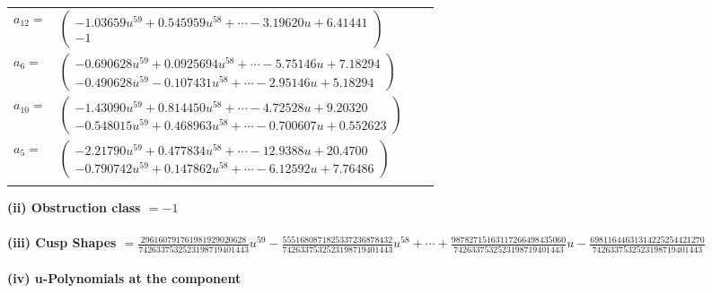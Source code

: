 \documentclass[1p]{elsarticle_modified}
\theoremstyle{definition}
\begin{document}
\begin{tabular}{m{7pt} m{180pt} m{7pt} m{180pt} }
\flushright $a_{12}=$&$\begin{pmatrix}-1.03659 u^{59}+0.545959 u^{58}+\cdots-3.19620 u+6.41441\\-1\end{pmatrix}$ \\
\flushright $a_{6}=$&$\begin{pmatrix}-0.690628 u^{59}+0.0925694 u^{58}+\cdots-5.75146 u+7.18294\\-0.490628 u^{59}-0.107431 u^{58}+\cdots-2.95146 u+5.18294\end{pmatrix}$ \\
\flushright $a_{10}=$&$\begin{pmatrix}-1.43090 u^{59}+0.814450 u^{58}+\cdots-4.72528 u+9.20320\\-0.548015 u^{59}+0.468963 u^{58}+\cdots-0.700607 u+0.552623\end{pmatrix}$ \\
\flushright $a_{5}=$&$\begin{pmatrix}-2.21790 u^{59}+0.477834 u^{58}+\cdots-12.9388 u+20.4700\\-0.790742 u^{59}+0.147862 u^{58}+\cdots-6.12592 u+7.76486\end{pmatrix}$\\&\end{tabular}
\flushleft \textbf{(ii) Obstruction class $= -1$}\\~\\
\flushleft \textbf{(iii) Cusp Shapes $= \frac{296160791761981929020628}{7426337532523198719401443} u^{59}-\frac{5551680871825337236878432}{7426337532523198719401443} u^{58}+\cdots+\frac{98782715163117266498435060}{7426337532523198719401443} u-\frac{69811644631314225254421270}{7426337532523198719401443}$}\\~\\
\newpage\renewcommand{\arraystretch}{1}
\flushleft \textbf{(iv) u-Polynomials at the component}\newline \\
\end{document}
